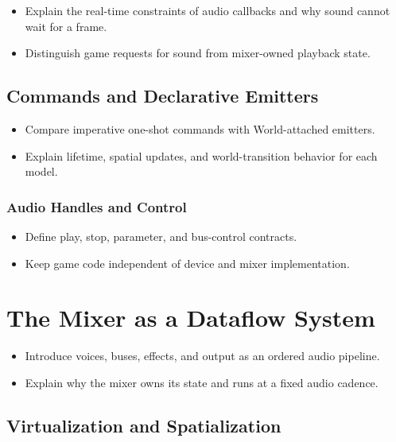 \documentclass[
  11pt,
  letterpaper,
  DIV=11,
  numbers=noendperiod,
  twoside,
  open=right]{scrreprt}
\providecommand{\tightlist}{%
  \setlength{\itemsep}{0pt}\setlength{\parskip}{0pt}}
\begin{document}
\begin{itemize}
\tightlist
\item
  Explain the real-time constraints of audio callbacks and why sound
  cannot wait for a frame.
\item
  Distinguish game requests for sound from mixer-owned playback state.
\end{itemize}

\subsection{Commands and Declarative
Emitters}\label{commands-and-declarative-emitters}

\begin{itemize}
\tightlist
\item
  Compare imperative one-shot commands with World-attached emitters.
\item
  Explain lifetime, spatial updates, and world-transition behavior for
  each model.
\end{itemize}

\subsubsection{Audio Handles and
Control}\label{audio-handles-and-control}

\begin{itemize}
\tightlist
\item
  Define play, stop, parameter, and bus-control contracts.
\item
  Keep game code independent of device and mixer implementation.
\end{itemize}

\section{The Mixer as a Dataflow
System}\label{the-mixer-as-a-dataflow-system}

\begin{itemize}
\tightlist
\item
  Introduce voices, buses, effects, and output as an ordered audio
  pipeline.
\item
  Explain why the mixer owns its state and runs at a fixed audio
  cadence.
\end{itemize}

\subsection{Virtualization and
Spatialization}\label{virtualization-and-spatialization}
\end{document}
